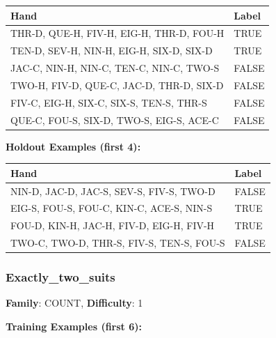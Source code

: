 \documentclass[10pt,a4paper]{article}
\begin{document}
\begin{small}
\begin{tabular}{p{8cm}l}
\toprule
Hand & Label \\
\midrule
THR-D, QUE-H, FIV-H, EIG-H, THR-D, FOU-H & \textcolor{positive}{TRUE} \\
TEN-D, SEV-H, NIN-H, EIG-H, SIX-D, SIX-D & \textcolor{positive}{TRUE} \\
JAC-C, NIN-H, NIN-C, TEN-C, NIN-C, TWO-S & \textcolor{negative}{FALSE} \\
TWO-H, FIV-D, QUE-C, JAC-D, THR-D, SIX-D & \textcolor{negative}{FALSE} \\
FIV-C, EIG-H, SIX-C, SIX-S, TEN-S, THR-S & \textcolor{negative}{FALSE} \\
QUE-C, FOU-S, SIX-D, TWO-S, EIG-S, ACE-C & \textcolor{negative}{FALSE} \\
\bottomrule
\end{tabular}
\end{small}

\textbf{Holdout Examples (first 4):}

\begin{small}
\begin{tabular}{p{8cm}l}
\toprule
Hand & Label \\
\midrule
NIN-D, JAC-D, JAC-S, SEV-S, FIV-S, TWO-D & \textcolor{negative}{FALSE} \\
EIG-S, FOU-S, FOU-C, KIN-C, ACE-S, NIN-S & \textcolor{positive}{TRUE} \\
FOU-D, KIN-H, JAC-H, FIV-D, EIG-H, FIV-H & \textcolor{positive}{TRUE} \\
TWO-C, TWO-D, THR-S, FIV-S, TEN-S, FOU-S & \textcolor{negative}{FALSE} \\
\bottomrule
\end{tabular}
\end{small}

\vspace{0.5cm}

\subsubsection{Exactly\_two\_suits}

\textbf{Family}: COUNT, \textbf{Difficulty}: 1

\textbf{Training Examples (first 6):}
\end{document}

